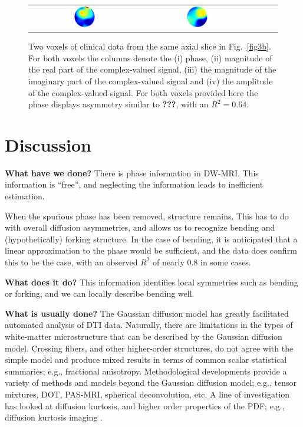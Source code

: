\documentclass[authoryear,preprint,12pt]{elsarticle}
\begin{document}
\begin{figure}[!htbp]
\begin{center}
\begin{tabular}{c|cccc}
      \includegraphics[width=0.2\textwidth]{73106.ps} & 
      \includegraphics[width=0.2\textwidth]{73107.ps}
    \end{tabular}
  \end{center}
  \caption{Two voxels of clinical data from the same axial slice in
    Fig.~\ref{fig3b}.  For both voxels the columns denote the (i)
    phase, (ii) magnitude of the real part of the complex-valued
    signal, (iii) the magnitude of the imaginary part of the
    complex-valued signal and (iv) the amplitude of the complex-valued
    signal.  For both voxels provided here the phase displays
    asymmetry similar to \textbf{???}, with an $R^2=0.64$.}
  \label{fig6}
\end{figure}

\section{Discussion}
\label{discussion}

\textbf{What have we done?}  There is phase information in DW-MRI.
This information is ``free'', and neglecting the information leads to
inefficient estimation.

When the spurious phase has been removed, structure remains.  This has
to do with overall diffusion asymmetries, and allows us to recognize
bending and (hypothetically) forking structure.  In the case of
bending, it is anticipated that a linear approximation to the phase
would be sufficient, and the data does confirm this to be the case,
with an observed $R^2$ of nearly 0.8 in some cases.

\textbf{What does it do?}  This information identifies local
symmetries such as bending or forking, and we can locally describe
bending well.

\textbf{What is usually done?}  The Gaussian diffusion model has
greatly facilitated automated analysis of DTI data.  Naturally, there
are limitations in the types of white-matter microstructure that can
be described by the Gaussian diffusion model.  Crossing fibers, and
other higher-order structures, do not agree with the simple model and
produce mixed results in terms of common scalar statistical summaries;
e.g., fractional anisotropy.  Methodological developments provide a
variety of methods and models beyond the Gaussian diffusion model;
e.g., tensor mixtures, DOT, PAS-MRI, spherical deconvolution, etc.  A
line of investigation has looked at diffusion kurtosis, and higher
order properties of the PDF; e.g., diffusion kurtosis imaging
\citep{Jensen2005}.
\end{document}
